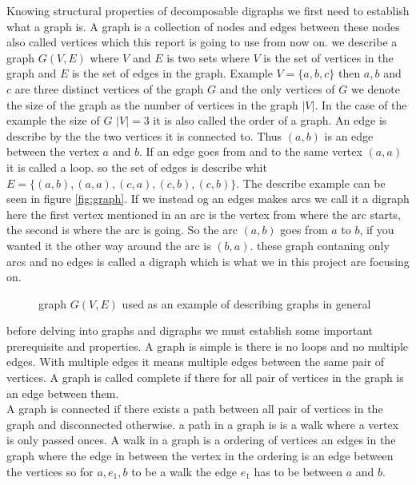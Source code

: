 Knowing structural properties of decomposable digraphs we first need to establish what a graph is.
A graph is a collection of nodes and edges between these nodes also called vertices which this report is going to use from now on.
we describe a graph $G(V,E)$ where $V$ and $E$ is two sets where $V$ is the set of vertices in the graph and $E$ is the set of edges in the graph.
Example $V=\lbrace a,b,c \rbrace$ then $a,b$ and $c$ are three distinct vertices of the graph $G$ and the only vertices of $G$ we denote the size of the graph as the number of vertices in the graph $|V|$.
In the case of the example the size of $G$ $|V|=3$ it is also called the order of a graph.
An edge is describe by the the two vertices it is connected to.
Thus $(a,b)$ is an edge between the vertex $a$ and $b$.
If an edge goes from and to the same vertex $(a,a)$ it is called a loop.
so the set of edges is describe whit $E=\lbrace (a,b),(a,a),(c,a),(c,b),(c,b)\rbrace$.
The describe example can be seen in figure \autoref{fig:graph}.
If we instead og an edges makes arcs we call it a digraph here the first vertex mentioned in an arc is the vertex from where the arc starts, the second is where the arc is going.
So the arc $(a,b)$ goes from $a$ to $b$, if you wanted it the other way around the arc is $(b,a)$.
these graph contaning only arcs and no edges is called a digraph which is what we in this project are focusing on.\\
\begin{figure}[!h]
    \centering
    \label{fig:graph}
    \caption{graph $G(V,E)$ used as an example of describing graphs in general}
\end{figure}


before delving into graphs and digraphs we must establish some important prerequisite and properties. 
A graph is simple is there is no loops and no multiple edges. 
With multiple edges it means multiple edges between the same pair of vertices.
A graph is called complete if there for all pair of vertices in the graph is an edge between them.\\
A graph is connected if there exists a path between all pair of vertices in the graph and disconnected otherwise.
a path in a graph is is a walk where a vertex is only passed onces.
A walk in a graph is a ordering of vertices an edges in the graph where the edge in between the vertex in the ordering is an edge between the vertices so for $a,e_1,b$ to be a walk the edge $e_1$ has to be between $a$ and $b$.

